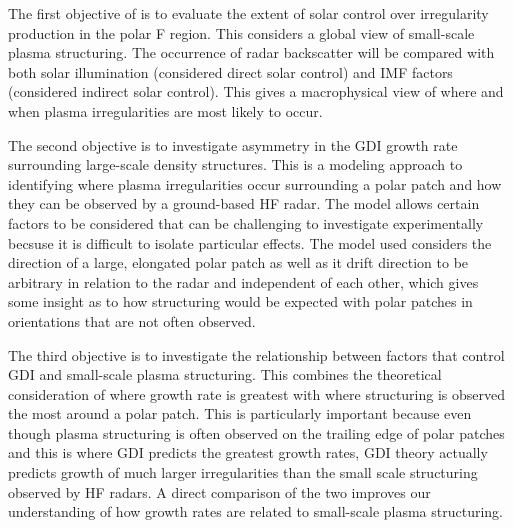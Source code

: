 The first objective of is to evaluate the extent of solar control over irregularity production in the polar F region.  This considers a global view of small-scale plasma structuring.  The occurrence of radar backscatter will be compared with both solar illumination (considered direct solar control) and IMF factors (considered indirect solar control).  This gives a macrophysical view of where and when plasma irregularities are most likely to occur.

The second objective is to investigate asymmetry in the GDI growth rate surrounding large-scale density structures.  This is a modeling approach to identifying where plasma irregularities occur surrounding a polar patch and how they can be observed by a ground-based HF radar.  The model allows certain factors to be considered that can be challenging to investigate experimentally becsuse it is difficult to isolate particular effects.  The model used considers the direction of a large, elongated polar patch as well as it drift direction to be arbitrary in relation to the radar and independent of each other, which gives some insight as to how structuring would be expected with polar patches in orientations that are not often observed.

The third objective is to investigate the relationship between factors that control GDI and small-scale plasma structuring.  This combines the theoretical consideration of where growth rate is greatest with where structuring is observed the most around a polar patch.  This is particularly important because even though plasma structuring is often observed on the trailing edge of polar patches and this is where GDI predicts the greatest growth rates, GDI theory actually predicts growth of much larger irregularities than the small scale structuring observed by HF radars.  A direct comparison of the two improves our understanding of how growth rates are related to small-scale plasma structuring.
